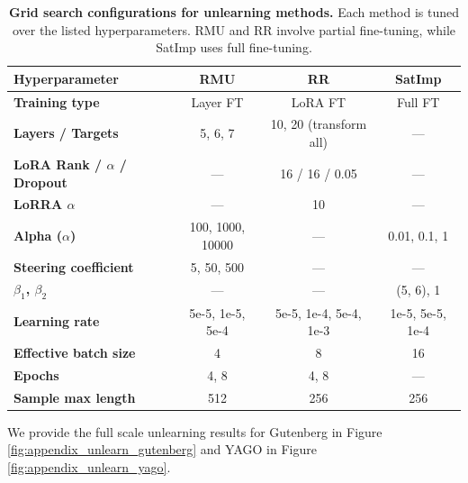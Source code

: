 \documentclass{article} %
\begin{document}
\begin{table}[h]
\centering
\small
\setlength{\tabcolsep}{6pt}
\renewcommand{\arraystretch}{1.2}
\begin{tabular}{lccc}
\toprule
\textbf{Hyperparameter} & \textbf{RMU} & \textbf{RR} & \textbf{SatImp} \\
\midrule
\textbf{Training type} & Layer FT & LoRA FT & Full FT \\
\textbf{Layers / Targets} & 5, 6, 7 & 10, 20 (transform all) & --- \\
\textbf{LoRA Rank / $\alpha$ / Dropout} & --- & 16 / 16 / 0.05 & --- \\
\textbf{LoRRA $\alpha$} & --- & 10 & --- \\
\textbf{Alpha ($\alpha$)} & 100, 1000, 10000 & --- & 0.01, 0.1, 1 \\
\textbf{Steering coefficient} & 5, 50, 500 & --- & --- \\
\textbf{$\beta_1$, $\beta_2$} & --- & --- & (5, 6), 1 \\
\textbf{Learning rate} & 5e-5, 1e-5, 5e-4 & 5e-5, 1e-4, 5e-4, 1e-3 & 1e-5, 5e-5, 1e-4 \\
\textbf{Effective batch size} & 4 & 8 & 16 \\
\textbf{Epochs} & 4, 8 & 4, 8 & --- \\
\textbf{Sample max length} & 512 & 256 & 256 \\
\bottomrule
\end{tabular}
\caption{\textbf{Grid search configurations for unlearning methods.} Each method is tuned over the listed hyperparameters. RMU and RR involve partial fine-tuning, while SatImp uses full fine-tuning.}
\label{tab:unlearn_grid_search}
\end{table}
\clearpage


We provide the full scale unlearning results for Gutenberg in Figure \ref{fig:appendix_unlearn_gutenberg} and YAGO in Figure \ref{fig:appendix_unlearn_yago}.
\end{document}
